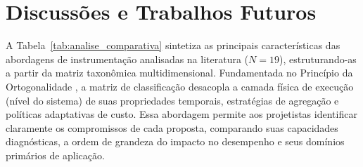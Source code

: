 \documentclass[sigconf, anonymous]{acmart}
\begin{document}
\section{Discussões e Trabalhos Futuros}

A Tabela~\ref{tab:analise_comparativa} sintetiza as principais características das abordagens de instrumentação analisadas na literatura ($N=19$), estruturando-as a partir da matriz taxonômica multidimensional. Fundamentada no Princípio da Ortogonalidade \cite{nickerson_2013}, a matriz de classificação desacopla a camada física de execução (nível do sistema) de suas propriedades temporais, estratégias de agregação e políticas adaptativas de custo. Essa abordagem permite aos projetistas identificar claramente os compromissos de cada proposta, comparando suas capacidades diagnósticas, a ordem de grandeza do impacto no desempenho e seus domínios primários de aplicação.
\end{document}
